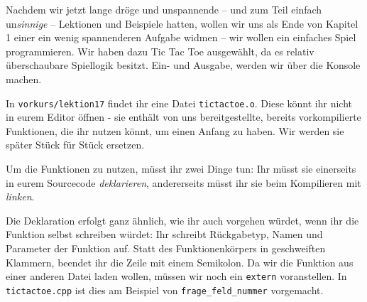 
Nachdem wir jetzt lange dröge und unspannende -- und zum Teil einfach
un\emph{sinnige} -- Lektionen und Beispiele hatten, wollen wir uns als Ende von
Kapitel 1 einer ein wenig spannenderen Aufgabe widmen -- wir wollen ein
einfaches Spiel programmieren. Wir haben dazu Tic Tac Toe ausgewählt, da es
relativ überschaubare Spiellogik besitzt. Ein- und Ausgabe, werden wir über die
Konsole machen.

In \texttt{vorkurs/lektion17} findet ihr eine Datei \texttt{tictactoe.o}. Diese
könnt ihr nicht in eurem Editor öffnen - sie enthält von uns bereitgestellte,
bereits vorkompilierte Funktionen, die ihr nutzen könnt, um einen Anfang zu
haben. Wir werden sie später Stück für Stück ersetzen.

Um die Funktionen zu nutzen, müsst ihr zwei Dinge tun: Ihr müsst sie einerseits
in eurem Sourcecode \emph{deklarieren}, andererseits müsst ihr sie beim
Kompilieren mit \emph{linken}.

Die Deklaration erfolgt ganz ähnlich, wie ihr auch vorgehen würdet, wenn ihr
die Funktion selbst schreiben würdet: Ihr schreibt Rückgabetyp, Namen und
Parameter der Funktion auf. Statt des Funktionenkörpers in geschweiften
Klammern, beendet ihr die Zeile mit einem Semikolon. Da wir die Funktion aus
einer anderen Datei laden wollen, müssen wir noch ein \texttt{extern}
voranstellen. In \texttt{tictactoe.cpp} ist dies am Beispiel von
\texttt{frage\_feld\_nummer} vorgemacht.

